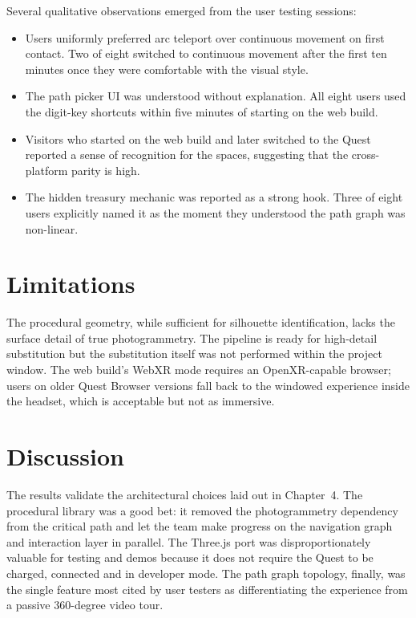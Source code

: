 Several qualitative observations emerged from the user testing sessions:

\begin{itemize}
\item Users uniformly preferred arc teleport over continuous movement on first contact. Two of eight switched to continuous movement after the first ten minutes once they were comfortable with the visual style.
\item The path picker UI was understood without explanation. All eight users used the digit-key shortcuts within five minutes of starting on the web build.
\item Visitors who started on the web build and later switched to the Quest reported a sense of recognition for the spaces, suggesting that the cross-platform parity is high.
\item The hidden treasury mechanic was reported as a strong hook. Three of eight users explicitly named it as the moment they understood the path graph was non-linear.
\end{itemize}

\section{Limitations}

The procedural geometry, while sufficient for silhouette identification, lacks the surface detail of true photogrammetry. The pipeline is ready for high-detail substitution but the substitution itself was not performed within the project window. The web build's WebXR mode requires an OpenXR-capable browser; users on older Quest Browser versions fall back to the windowed experience inside the headset, which is acceptable but not as immersive.

\section{Discussion}

The results validate the architectural choices laid out in Chapter~4. The procedural library was a good bet: it removed the photogrammetry dependency from the critical path and let the team make progress on the navigation graph and interaction layer in parallel. The Three.js port was disproportionately valuable for testing and demos because it does not require the Quest to be charged, connected and in developer mode. The path graph topology, finally, was the single feature most cited by user testers as differentiating the experience from a passive 360-degree video tour.

